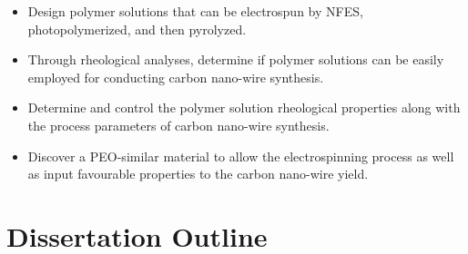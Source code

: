 \begin{itemize}
	\item{
	Design polymer solutions that can be electrospun by NFES, photopolymerized, and then pyrolyzed.
    }
    \item{
    Through rheological analyses, determine if polymer solutions can be easily employed for conducting carbon nano-wire synthesis.
    }
    \item{
    Determine and control the polymer solution rheological properties along with the process parameters of carbon nano-wire synthesis.
    }
    \item{
    Discover a PEO-similar material to allow the electrospinning process as well as input favourable properties to the carbon nano-wire yield.
    }
\end{itemize}

\section{Dissertation Outline}



